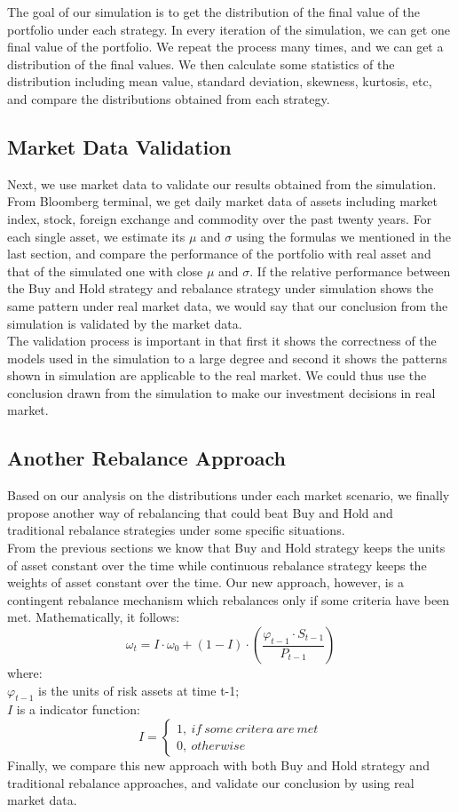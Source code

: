\documentclass[
10pt, %
a4paper, %
oneside, %
headinclude,footinclude, %
BCOR5mm, %
]{scrartcl}
\begin{document}
The goal of our simulation is to get the distribution of the final value of the portfolio under each strategy. In every iteration of the simulation, we can get one final value of the portfolio. We repeat the process many times, and we can get a distribution of the final values. We then calculate some statistics of the distribution including mean value, standard deviation, skewness, kurtosis, etc, and compare the distributions obtained from each strategy.
\subsection{Market Data Validation}
Next, we use market data to validate our results obtained from the simulation.\\
From Bloomberg terminal, we get daily market data of assets including market index, stock, foreign exchange and commodity over the past twenty years. For each single asset, we estimate its $\mu$ and $\sigma$ using the formulas we mentioned in the last section, and compare the performance of the portfolio with real asset and that of the simulated one with close $\mu$ and $\sigma$. If the relative performance between the Buy and Hold strategy and rebalance strategy under simulation shows the same pattern under real market data, we would say that our conclusion from the simulation is validated by the market data. \\
The validation process is important in that first it shows the correctness of the models used in the simulation to a large degree and second it shows the patterns shown in simulation are applicable to the real market. We could thus use the conclusion drawn from the simulation to make our investment decisions in real market.
\subsection{Another Rebalance Approach}
Based on our analysis on the distributions under each market scenario, we finally propose another way of rebalancing that could beat Buy and Hold and traditional rebalance strategies under some specific situations.\\
From the previous sections we know that Buy and Hold strategy keeps the units of asset constant over the time while continuous rebalance strategy keeps the weights of asset constant over the time. Our new approach, however, is a contingent rebalance mechanism which rebalances only if some criteria have been met. Mathematically, it follows:
$$\omega_t = I\cdot\omega_0 + (1-I)\cdot(\frac{\varphi_{t-1} \cdot S_{t-1} }{P_{t-1}})$$
where: \\
$\varphi_{t-1}$ is the units of risk assets at time t-1;\\
$I$ is a indicator function:
$$I = \left\{\begin{array}{ll}
1,\ if\ some\ critera\ are\ met \\
0,\ otherwise
\end{array}
\right.$$
Finally, we compare this new approach with both Buy and Hold strategy and traditional rebalance approaches, and validate our conclusion by using real market data.
\end{document}
